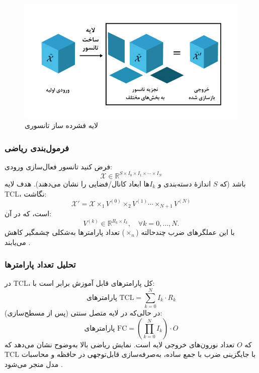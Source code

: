 \begin{figure}[h]
	\centering
	\begin{minipage}[b]{0.7\textwidth}
		\centering
		\includegraphics[width=\textwidth]{transformer_images/persian images/b14.png}
		\caption{لایه فشرده ساز تانسوری}
		\label{fig:tensor_contraction_layer}
	\end{minipage}
	\hfill
\end{figure}




\subsubsection*{فرمول‌بندی ریاضی}

فرض کنید تانسور فعال‌سازی ورودی:
\[
\mathcal{X} \in \mathbb{R}^{S \times I_0 \times I_1 \times \cdots \times I_N}
\]
باشد (که \(S\) اندازهٔ دسته‌بندی و \(I_k\)ها ابعاد کانال/فضایی را نشان می‌دهند). هدف لایه TCL، نگاشت:
\[
\mathcal{X}' = \mathcal{X} \times_1 V^{(0)} \times_2 V^{(1)} \cdots \times_{N+1} V^{(N)}
\]
است، که در آن:
\[
V^{(k)} \in \mathbb{R}^{R_k \times I_k}, \quad \forall k = 0,\dots,N.
\]
با این عملگرهای ضرب چندحالته (\(\times_n\)) تعداد پارامترها به‌شکلی چشمگیر کاهش می‌یابند \cite{kossaifi2017tensorcontraction}.







\subsubsection*{تحلیل تعداد پارامترها}

در TCL، کل پارامترهای قابل آموزش برابر است با:
\[
\text{پارامترهای TCL} = \sum_{k=0}^{N} I_k \cdot R_k
\]
در حالی‌که در لایه متصل سنتی (پس از مسطح‌سازی):
\[
\text{پارامترهای FC} = \left(\prod_{k=0}^{N} I_k\right) \cdot O
\]
که \(O\) تعداد نورون‌های خروجی لایه است. نمایش ریاضی بالا به‌وضوح نشان می‌دهد که TCL با جایگزینی ضرب با جمع ساده، به‌صرفه‌سازی قابل‌توجهی در حافظه و محاسبات مدل منجر می‌شود \cite{kossaifi2017tensorcontraction,kossaifi2020tensorregression}.

